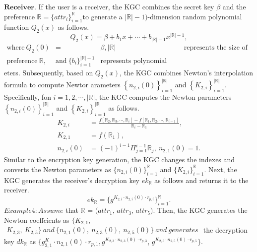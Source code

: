 \documentclass[runningheads]{llncs}
\begin{document}
$\textbf{Receiver.}$ If the user is a receiver, the KGC combines the secret key $\beta$ and the preference $\mathbb{R}=\{attr_i\}_{i=1}^\mathbb{R}$to generate a $|\mathbb{R}|-1)$-dimension random polynomial function $Q_2(x)$ as follows.
$$Q_2(x)=\beta+b_1x+\cdots+b_{|\mathbb{R}|-1}x^{|\mathbb{R}|-1},$$
$\begin{array}{rcl}\mathrm{where~}Q_2(0)&=&\beta,|\mathbb{R}|&\text{represents the size of the}\\\mathrm{preference~}\mathbb{R},&\mathrm{and~}\{b_i\}_{i=1}^{|\mathbb{R}|-1}&\text{represents polynomial param}\end{array}$ eters. Subsequently, based on $Q_2(x)$, the KGC combines Newton's interpolation formula to compute Newtor arameters $\left\{n_{2,i}(0)\right\}_{i=1}^{|\mathbb{R}|}$ and $\left\{K_{2,i}\right\}_{i=1}^{|\mathbb{R}|}.$ Specifically, fon $i=1,2,\cdots,|\mathbb{R}|$, the KGC computes the Newton parameters $\left\{n_{2,i}(0)\right\}_{i=1}^{|\mathbb{R}|}$ and $\left\{K_{2,i}\right\}_{i=1}^{|\mathbb{R}|}$ as follows.
$$\begin{aligned}K_{2,i}&=\frac{f[\mathbb{R}_2,\mathbb{R}_3,\cdots,\mathbb{R}_i]-f[\mathbb{R}_1,\mathbb{R}_2,\cdots,\mathbb{R}_{i-1}]}{\mathbb{R}_i-\mathbb{R}_1},\\K_{2,1}&=f(\mathbb{R}_1),\\n_{2,i}(0)&=(-1)^{i-1}\Pi_{j=1}^{i-1}\mathbb{R}_j,\:n_{2,1}(0)=1.\end{aligned}$$
Similar to the encryption key generation, the KGC changes the indexes and converts the Newton parameters as $\{n_{2,i}(0)\}_{i=1}^\mathbb{R}$ and $\{K_{2,i}\}_{i=1}^\mathbb{R}.$ Next, the KGC generates the receiver's decryption key $ek_\mathbb{R}$ as follows and returns
it to the receiver.
$$ek_\mathbb{R}=\{g^{K_{2,i}\cdot n_{2,i}(0)\cdot r_{p,i}}\}_{i=1}^\mathbb{R}.$$
$Example4: Assume$ that $\mathbb{R}$ = $( attr_1$, $attr_3$, $attr_5) .$
Then, the KGC generates the Newton coeffcients as $\{K_{2,1}$,
$\begin{aligned}K_{2,3},\: K_{2,5}\}\: and\:\{n_{2,1}(0),\: n_{2,3}(0),\: n_{2,5}(0)\}\: and\: generates\end{aligned}$
the decryption key $dk_\mathbb{R}$ as $\{g^K_{2,1}\cdot n_{2,1}(0)\cdot r_{p,1},g^{K_{2,3}\cdot n_{2,3}(0)\cdot r_{p,3}}$,
$g^{K_{2,5}\cdot n_{2,5}(0)\cdot r_{p,5}}\}.$
\end{document}
